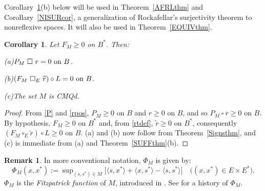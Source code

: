 \documentclass[letterpaper]{article}
\theoremstyle{plain}
\newtheorem{corollary}[theorem]{Corollary}
\theoremstyle{definition}
\newtheorem{remark}[theorem]{Remark}
\numberwithin{equation}{section}
\newcommand{\bra}[2]{\langle#1,#2\rangle}
\newcommand{\cmqd}{{CMQd}}
\newcommand{\on}{\hbox{on}}
\newcommand{\rt}{\wt r}
\newcommand{\squaree}{\ \square_E\ }
\newcommand{\ssquare}{\ \square\ }
\newcommand{\supn}{\sup\nolimits}
\newcommand{\wt}{\widetilde}
\newcommand{\Cor}{Corollary~\ref}
\newcommand{\Rem}{Remark~\ref}
\newcommand{\Sec}{Section~\ref}
\newcommand{\Thm}{Theorem~\ref}
\begin{document}
%
\Cor{Signscor}(b) below will be used in \Thm{AFRLthm} and \Cor{NISURcor}, a generalization of Rockafellar's surjectivity theorem to nonreflexive spaces.   It will also be used in \Thm{EQUIVthm}.
\begin{corollary}\label{Signscor}
Let $F_M \ge 0$ on $B^*$.   Then:
\par
\noindent
{\rm(a)}\enspace $P_M \ssquare r = 0\ \on\ B$.
\par
\noindent
{\rm(b)}\enspace $(F_M \squaree \rt)\circ L = 0\ \on\ B$.
\par
\noindent
{\rm(c)}\enspace The set $M$ is \cmqd.%
\end{corollary}
\begin{proof}
 From \eqref{P} and \eqref{rpos}, $P_M \ge 0$ on $B$ and $r \ge 0$ on $B$, and so $P_M \ssquare r \ge 0$ on $B$.  By hypothesis, $F_M \ge 0$ on $B^*$ and, from \eqref{rtdef}, $\rt \ge 0$ on $B^*$, consequently $(F_M \squaree \rt)\circ L \ge 0$ on $B$.   (a) and (b) now follow from \Thm{Signsthm}, and (c) is immediate from (a) and \Thm{SUFFthm}(b).
\end{proof}
\begin{remark}\label{PHrem}
%
In more conventional notation, $\Phi_M$ is given by:
\begin{equation*}%
\Phi_M(x,x^*) := \supn_{(s,s^*) \in M}\big[\bra{s}{x^*} + \bra{x}{s^*} - \bra{s}{s^*}\big]\quad\big((x,x^*) \in E \times E^*\big).
\end{equation*}
%
$\Phi_M$ is the {\em Fitzpatrick function} of $M$, introduced in \cite{FITZ}.   See \cite[Section 23, pp. 99-103]{HBM} for a history of $\Phi_M$.   
\end{remark}
\end{document}
